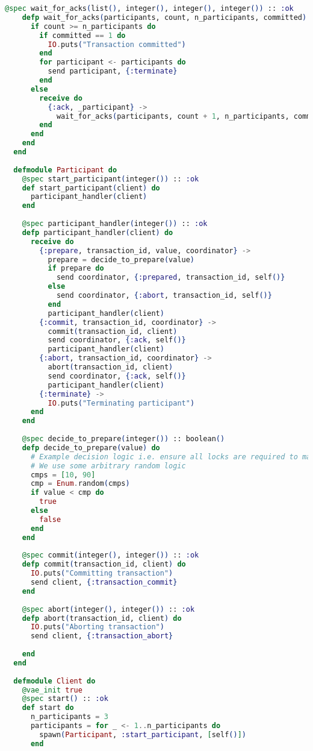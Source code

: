 \begin{lstlisting}[language=Elixir, xleftmargin=.1\linewidth]
    @spec wait_for_acks(list(), integer(), integer(), integer()) :: :ok
    defp wait_for_acks(participants, count, n_participants, committed) do
      if count >= n_participants do
        if committed == 1 do
          IO.puts("Transaction committed")
        end
        for participant <- participants do
          send participant, {:terminate}
        end
      else
        receive do
          {:ack, _participant} ->
            wait_for_acks(participants, count + 1, n_participants, committed)
        end
      end
    end
  end
  
  defmodule Participant do
    @spec start_participant(integer()) :: :ok
    def start_participant(client) do
      participant_handler(client)
    end
  
    @spec participant_handler(integer()) :: :ok
    defp participant_handler(client) do
      receive do
        {:prepare, transaction_id, value, coordinator} ->
          prepare = decide_to_prepare(value)
          if prepare do
            send coordinator, {:prepared, transaction_id, self()}
          else
            send coordinator, {:abort, transaction_id, self()}
          end
          participant_handler(client)
        {:commit, transaction_id, coordinator} ->
          commit(transaction_id, client)
          send coordinator, {:ack, self()}
          participant_handler(client)
        {:abort, transaction_id, coordinator} ->
          abort(transaction_id, client)
          send coordinator, {:ack, self()}
          participant_handler(client)
        {:terminate} ->
          IO.puts("Terminating participant")
      end
    end
  
    @spec decide_to_prepare(integer()) :: boolean()
    defp decide_to_prepare(value) do
      # Example decision logic i.e. ensure all locks are required to make the commit
      # We use some arbitrary random logic
      cmps = [10, 90]
      cmp = Enum.random(cmps)
      if value < cmp do
        true
      else
        false
      end
    end
  
    @spec commit(integer(), integer()) :: :ok
    defp commit(transaction_id, client) do
      IO.puts("Committing transaction")
      send client, {:transaction_commit}
    end
  
    @spec abort(integer(), integer()) :: :ok
    defp abort(transaction_id, client) do
      IO.puts("Aborting transaction")
      send client, {:transaction_abort}
  
    end
  end
  
  defmodule Client do
    @vae_init true
    @spec start() :: :ok
    def start do
      n_participants = 3
      participants = for _ <- 1..n_participants do
        spawn(Participant, :start_participant, [self()])
      end
  

\end{lstlisting}
